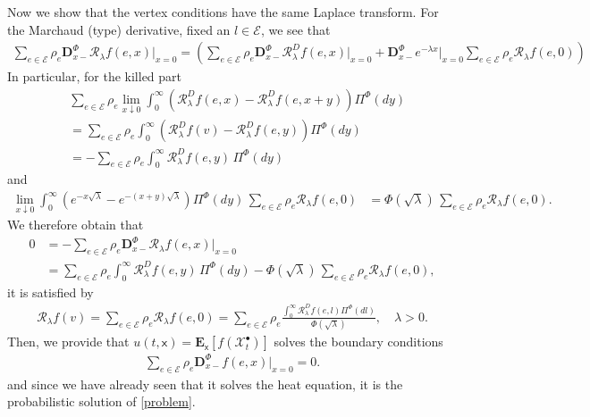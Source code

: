 \documentclass[11pt,a4paper]{article}
\theoremstyle{plain}
\theoremstyle{definition}
\theoremstyle{remark}
\begin{document}
		Now we show that the vertex conditions have the same Laplace transform.
		For the Marchaud (type) derivative, fixed an $l \in \mathcal{E}$, we see that
		\begin{align*}
			\sum_{e \in \mathcal{E}}\rho_e \mathbf{D}_{x-}^\Phi \mathcal{R}_\lambda f(e,x)\big\vert_{x=0}  = \left(\sum_{e \in \mathcal{E}} \rho_e \mathbf{D}_{x-}^\Phi \mathcal{R}_\lambda^D f(e,x)\big\vert_{x=0} + \mathbf{D}_{x-}^\Phi e^{-\lambda x}\big\vert_{x=0}\sum_{e \in \mathcal{E}} \rho_e {\mathcal{R}}_\lambda f(e,0)\right)
		\end{align*}
		In particular, for the killed part
		\begin{align*}
			&\sum_{e \in \mathcal{E}} \rho_e \lim_{x\downarrow 0}  \int_0^\infty \left( \mathcal{R}^D_\lambda f(e,x) - \mathcal{R}^D_\lambda f(e,x+y) \right) \Pi^\Phi(dy) \\
			& = \sum_{e \in \mathcal{E}} \rho_e \int_0^\infty \left( \mathcal{R}^D_\lambda f(v) - \mathcal{R}^D_\lambda f(e,y) \right) \Pi^\Phi(dy) \\
			& = - \sum_{e \in \mathcal{E}} \rho_e \int_0^\infty \mathcal{R}^D_\lambda f(e,y)\, \Pi^\Phi(dy)
		\end{align*}
		and
		\begin{align*}
			\lim_{x\downarrow 0}  \int_0^\infty \left( e^{-x \sqrt{\lambda}} - e^{-(x+y) \sqrt{\lambda}} \right) \Pi^\Phi(dy)\, \sum_{e \in \mathcal{E}} \rho_e {\mathcal{R}}_\lambda f(e,0)
			&= \Phi(\sqrt{\lambda})\, \sum_{e \in \mathcal{E}} \rho_e {\mathcal{R}}_\lambda f(e,0).
		\end{align*}
		We therefore obtain that
		\begin{align}
			\label{marchaud-graphs}
			0&=- \sum_{e \in \mathcal{E}} \rho_e \mathbf{D}_{x-}^\Phi \mathcal{R}_\lambda f(e,x)\big\vert_{x=0}\\
			& =\sum_{e \in \mathcal{E}} \rho_e \int_0^\infty \mathcal{R}_\lambda^D f(e,y)\, \Pi^\Phi(dy) - \Phi(\sqrt{\lambda})\, \sum_{e \in \mathcal{E}} \rho_e {\mathcal{R}}_\lambda f(e,0),
		\end{align}
		it is satisfied by
		\begin{align}
			\label{BCresolvent2G}
			\mathcal{R}_\lambda f(v) = \sum_{e \in \mathcal{E}} \rho_e {\mathcal{R}}_\lambda f(e,0)=\sum_{e \in \mathcal{E}} \rho_e \frac{\int_0^\infty \mathcal{R}_\lambda^D f(e, l) \Pi^\Phi(dl)}{\Phi(\sqrt{\lambda})}, \quad \lambda>0.
		\end{align}
		Then, we provide that $u(t,\mathsf{x})=\mathbf{E}_\mathsf{x}[f(\mathcal{X}^\bullet_t)]$ solves the boundary conditions
		\begin{align*}
			\sum_{e \in \mathcal{E}} \rho_e  \mathbf{D}_{x-}^\Phi f(e,x)\big\vert_{x=0}=0.
		\end{align*}
		and since we have already seen that it solves the heat equation, it is the probabilistic solution of \eqref{problem}.
		
\end{document}
